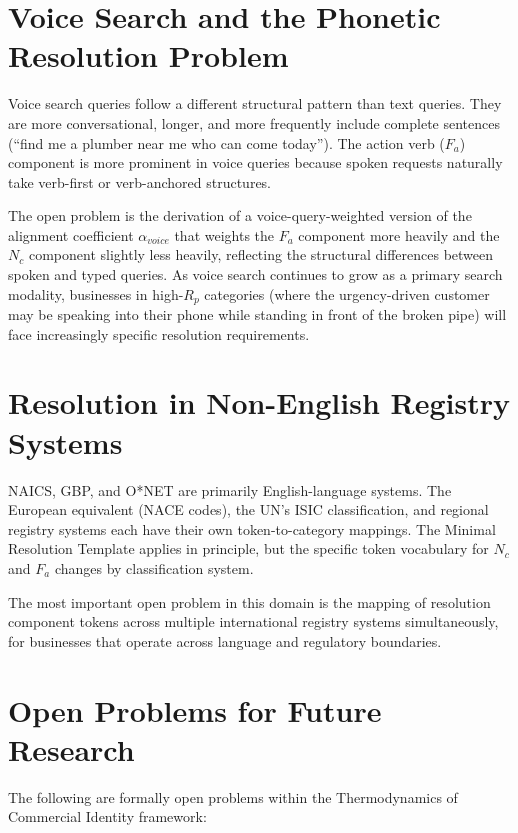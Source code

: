 \documentclass[12pt, openany]{book}
\theoremstyle{thmstyle}
\theoremstyle{defstyle}
\begin{document}
\section{Voice Search and the Phonetic Resolution Problem}

Voice search queries follow a different structural pattern than text queries. They are more conversational, longer, and more frequently include complete sentences (``find me a plumber near me who can come today''). The action verb ($F_a$) component is more prominent in voice queries because spoken requests naturally take verb-first or verb-anchored structures.

The open problem is the derivation of a voice-query-weighted version of the alignment coefficient $\alpha_{voice}$ that weights the $F_a$ component more heavily and the $N_c$ component slightly less heavily, reflecting the structural differences between spoken and typed queries. As voice search continues to grow as a primary search modality, businesses in high-$R_p$ categories (where the urgency-driven customer may be speaking into their phone while standing in front of the broken pipe) will face increasingly specific resolution requirements.

\section{Resolution in Non-English Registry Systems}

NAICS, GBP, and O*NET are primarily English-language systems. The European equivalent (NACE codes), the UN's ISIC classification, and regional registry systems each have their own token-to-category mappings. The Minimal Resolution Template applies in principle, but the specific token vocabulary for $N_c$ and $F_a$ changes by classification system.

The most important open problem in this domain is the mapping of resolution component tokens across multiple international registry systems simultaneously, for businesses that operate across language and regulatory boundaries.

\section{Open Problems for Future Research}

The following are formally open problems within the Thermodynamics of Commercial Identity framework:
\end{document}
